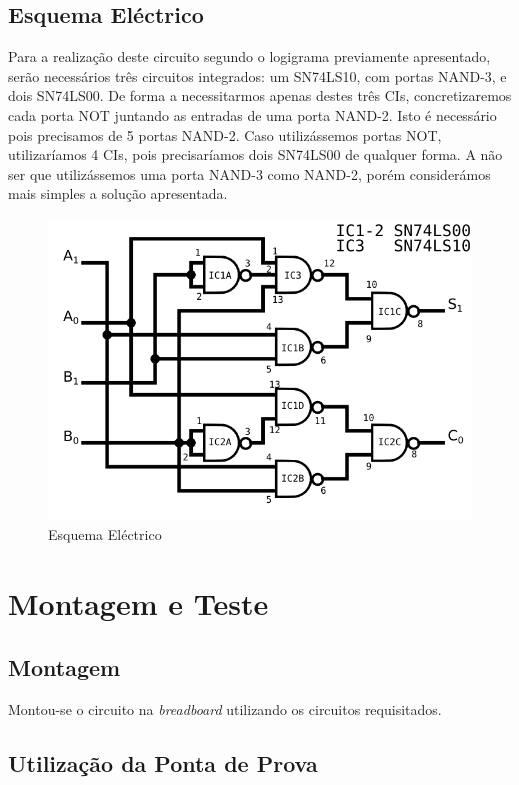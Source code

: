\documentclass[a4paper,12pt]{article}
\begin{document}
\subsection{Esquema Eléctrico}
Para a realização deste circuito segundo o logigrama previamente apresentado, serão necessários três circuitos integrados: um SN74LS10, com portas NAND-3, e dois SN74LS00. De forma a necessitarmos apenas destes três CIs, concretizaremos cada porta NOT juntando as entradas de uma porta NAND-2. Isto é necessário pois precisamos de 5 portas NAND-2. Caso utilizássemos portas NOT, utilizaríamos 4 CIs, pois precisaríamos dois SN74LS00 de qualquer forma. A não ser que utilizássemos uma porta NAND-3 como NAND-2, porém considerámos mais simples a solução apresentada.

\begin{figure}[h]
\caption{Esquema Eléctrico}
\begin{center}
\includegraphics[scale=0.65]{SD_elect.png}
\end{center}
\end{figure}

\section{Montagem e Teste}
\subsection{Montagem}
Montou-se o circuito na {\it breadboard} utilizando os circuitos requisitados.
\subsection{Utilização da Ponta de Prova}
\vspace*{10\baselineskip}
\end{document}

